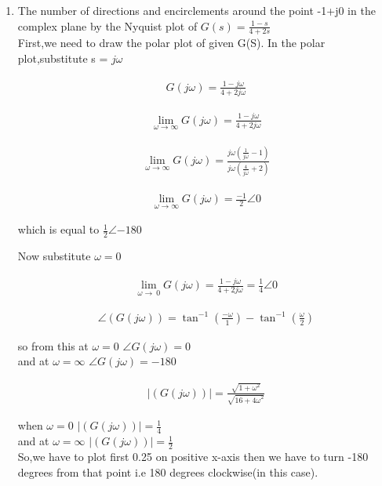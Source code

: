 \begin{enumerate}[label=\thesection.\arabic*.,ref=\thesection.\theenumi]
\item The number of directions and encirclements around the point -1+j0 in the complex plane by the Nyquist plot of $G(s) = \frac{1-s}{4+2s}$\\

\solution
First,we need to draw the polar plot of given G(S).
In the polar plot,substitute s = $j\omega$

\begin{align}
G(j\omega) = \frac{1-j\omega}{4+2j\omega} 
\end{align}

\begin{align}
\lim_{\omega\to\infty} G(j\omega) = \frac{1-j\omega}{4+2j\omega} 
\end{align}

\begin{align}
\lim_{\omega\to\infty} G(j\omega) = \frac{j\omega(\frac{1}{j\omega}-1)}{j\omega(\frac{4}{j\omega}+2)}  
\end{align}

\begin{align}
\lim_{\omega\to\infty} G(j\omega) = \frac{-1}{2}\angle 0  
\end{align}

\begin{center}
which is equal to $\frac{1}{2}\angle{-180}$   
\end{center}
Now substitute $\omega = 0$

\begin{align}
\lim_{\omega\to\ 0} G(j\omega) = \frac{1-j\omega}{4+2j\omega} = \frac{1}{4}\angle 0 
\end{align}

\begin{align}
\angle (G(j\omega)) = \tan^{-1}(\frac{-\omega}{1}) - \tan^{-1}(\frac{\omega}{2})
\end{align}

so from this  at $\omega = 0$ $\angle G(j\omega) = 0$ 
\\
and at $\omega = \infty$ $\angle G(j\omega)  =-180$     


\begin{align}
\mid(G(j\omega))\mid = \frac{\sqrt{1+{\omega}^2}}{\sqrt{16+{4\omega}^2}} 
\end{align}

when $\omega = 0$ $\mid(G(j\omega))\mid = \frac{1}{4}$ 
\\
and at  $\omega = \infty$ $\mid(G(j\omega))\mid = \frac{1}{2}$
\\
So,we have to plot first 0.25 on positive x-axis then we have to turn {-180} degrees from that point i.e {180} degrees clockwise(in this case).\\


\end{enumerate}
